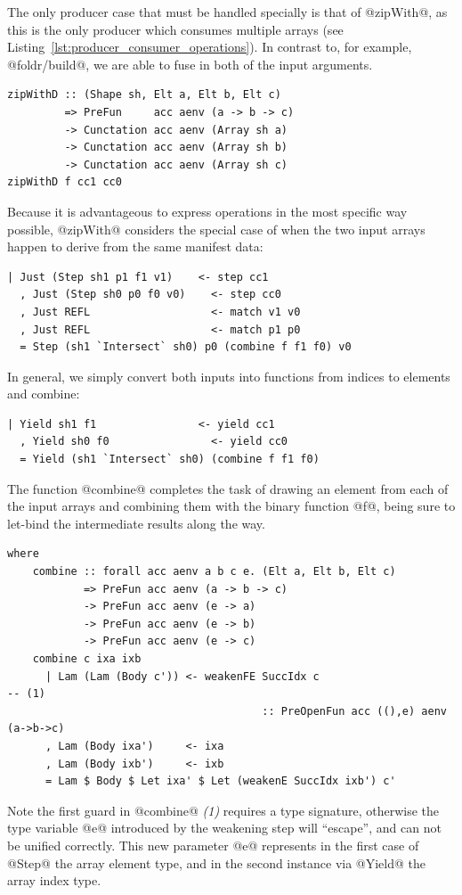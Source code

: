 The only producer case that must be handled specially is  that of @zipWith@, as
this is the only producer which consumes multiple arrays (see
Listing~\ref{lst:producer_consumer_operations}). In contrast to, for example,
@foldr/build@, we are able to fuse in both of the
input arguments.
%
\begin{lstlisting}[style=haskell
    ,name=zipWithD
    ,label=lst:zipWithD
    ,caption={[Smart constructor for fusing the \code{zipWith} operation]}]
zipWithD :: (Shape sh, Elt a, Elt b, Elt c)
         => PreFun     acc aenv (a -> b -> c)
         -> Cunctation acc aenv (Array sh a)
         -> Cunctation acc aenv (Array sh b)
         -> Cunctation acc aenv (Array sh c)
zipWithD f cc1 cc0
\end{lstlisting}
%
Because it is advantageous to express operations in the most specific way
possible, @zipWith@ considers the special case of when the two input arrays
happen to derive from the same manifest data:
%
\begin{lstlisting}[style=haskell,name=zipWithD]
  | Just (Step sh1 p1 f1 v1)    <- step cc1
  , Just (Step sh0 p0 f0 v0)    <- step cc0
  , Just REFL                   <- match v1 v0
  , Just REFL                   <- match p1 p0
  = Step (sh1 `Intersect` sh0) p0 (combine f f1 f0) v0
\end{lstlisting}
%
In general, we simply convert both inputs into functions from indices to
elements and combine:
%
\begin{lstlisting}[style=haskell,name=zipWithD]
  | Yield sh1 f1                <- yield cc1
  , Yield sh0 f0                <- yield cc0
  = Yield (sh1 `Intersect` sh0) (combine f f1 f0)
\end{lstlisting}
%
The function @combine@ completes the task of drawing an element from each
of the input arrays and combining them with the binary function @f@, being
sure to let-bind the intermediate results along the way.
%
\begin{lstlisting}[style=haskell
    ,name=zipWithD
    ,caption={Smart constructor for fusing the \code{zipWith} operation}]
  where
    combine :: forall acc aenv a b c e. (Elt a, Elt b, Elt c)
            => PreFun acc aenv (a -> b -> c)
            -> PreFun acc aenv (e -> a)
            -> PreFun acc aenv (e -> b)
            -> PreFun acc aenv (e -> c)
    combine c ixa ixb
      | Lam (Lam (Body c')) <- weakenFE SuccIdx c                                    -- (1)
                                        :: PreOpenFun acc ((),e) aenv (a->b->c)
      , Lam (Body ixa')     <- ixa
      , Lam (Body ixb')     <- ixb
      = Lam $ Body $ Let ixa' $ Let (weakenE SuccIdx ixb') c'
\end{lstlisting}
%
Note the first guard in @combine@ \emph{(1)} requires a type signature,
otherwise the type variable @e@ introduced by the weakening step will
``escape'', and can not be unified correctly. This new parameter @e@ represents
in the first case of @Step@ the array element type, and in the second instance
via @Yield@ the array index type.


